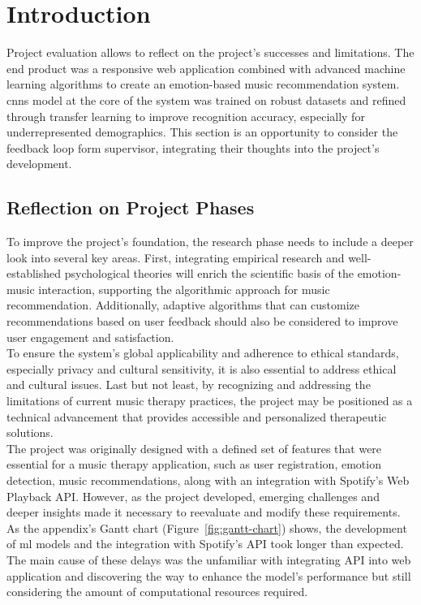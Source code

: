 \section{Introduction}
Project evaluation allows to reflect on the project's successes and limitations.
The end product was a responsive web application combined with advanced machine learning algorithms to create an emotion-based music recommendation system.
\gls{cnns} model at the core of the system was trained on robust datasets and refined through transfer learning to improve recognition accuracy, especially for underrepresented demographics.
This section is an opportunity to consider the feedback loop form supervisor, integrating their thoughts into the project's development.

\subsection{Reflection on Project Phases}
To improve the project's foundation, the research phase needs to include a deeper look into several key areas.
First, integrating empirical research and well-established psychological theories will enrich the scientific basis of the emotion-music interaction, supporting the algorithmic approach for music recommendation.
Additionally, adaptive algorithms that can customize recommendations based on user feedback should also be considered to improve user engagement and satisfaction.
\\
\indent To ensure the system's global applicability and adherence to ethical standards, especially privacy and cultural sensitivity, it is also essential to address ethical and cultural issues.
Last but not least, by recognizing and addressing the limitations of current music therapy practices, the project may be positioned as a technical advancement that provides accessible and personalized therapeutic solutions.
\\
\indent The project was originally designed with a defined set of features that were essential for a music therapy application, such as user registration, emotion detection, music recommendations, along with an integration with Spotify's Web Playback API.
However, as the project developed, emerging challenges and deeper insights made it necessary to reevaluate and modify these requirements.
As the appendix's Gantt chart (Figure~\ref{fig:gantt-chart}) shows, the development of \gls{ml} models and the integration with Spotify's API took longer than expected. 
The main cause of these delays was the unfamiliar with integrating API into web application and discovering the way to enhance the model's performance but still considering the amount of computational resources required.
